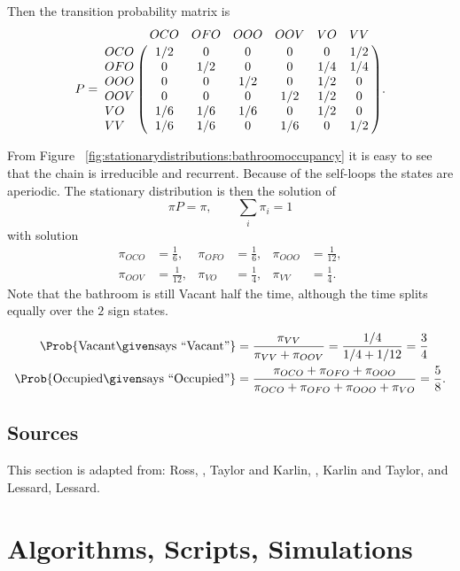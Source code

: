 \documentclass[12pt]{article}
\begin{document}
Then the transition probability matrix is
\[
    P= \bordermatrix{ & OCO & OFO & OOO & OOV & VO & VV \cr
    OCO & 1/2 & 0 & 0 & 0 & 0 & 1/2 \cr
    OFO & 0 & 1/2 & 0 & 0 & 1/4 & 1/4 \cr
    OOO & 0 & 0 & 1/2 & 0 & 1/2 & 0 \cr
    OOV & 0 & 0 & 0 & 1/2 & 1/2 & 0 \cr
    VO & 1/6 & 1/6 & 1/6 & 0 & 1/2 & 0 \cr
    VV & 1/6 & 1/6 & 0 & 1/6 & 0 & 1/2 \cr
    }.
\]

From Figure~%
\ref{fig:stationarydistributions:bathroomoccupancy} it is easy to see
that the chain is irreducible and recurrent.  Because of the self-loops
the states are aperiodic.  The stationary distribution is then the
solution of
\[
    \pi P = \pi, \qquad \sum\limits_{i} \pi_i = 1
\] with solution
\begin{align*}
    \pi_{OCO} &= \frac{1}{6}, & \pi_{OFO} &= \frac{1}{6}, & \pi_{OOO} &=
    \frac {1}{12}, \\
    \pi_{OOV} &= \frac{1}{12}, & \pi_{VO} &= \frac{1}{4}, & \pi_{VV} &=
    \frac{1}{4}.
\end{align*}
Note that the bathroom is still Vacant half the time, although the time
splits equally over the \( 2 \) sign states.

\begin{align*}
    \Prob{ \text{Vacant}\given \text{says ``Vacant''}} &= \frac{\pi_{VV}}
    {\pi_{VV}+\pi_{OOV}} = \frac{1/4}{1/4+1/12} = \frac{3}{4}\\
    \Prob{ \text{Occupied}\given \text{says ``Occupied''} } &= \frac{\pi_
    {OCO}+\pi_{OFO}+\pi_{OOO}} {\pi_{OCO}+\pi_{OFO}+\pi_{OOO}+\pi_{VO}}
    =\frac{5}{8}.
\end{align*}

\subsection*{Sources}

This section is adapted from:  Ross, , Taylor and Karlin, , Karlin and Taylor,  and Lessard, 
{Lessard}.

\nocite{ross97}
\nocite{taylor98-introd-stoch-model}
\nocite{karlin81-secon-cours-stoch-proces}

\hr

\section*{Algorithms, Scripts, Simulations}
\end{document}
